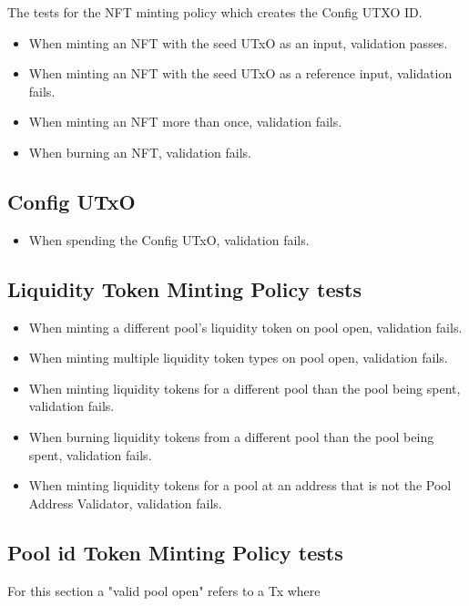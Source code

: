 \documentclass{article}
\begin{document}
The tests for the NFT minting policy which creates the Config UTXO ID.
\begin{itemize}
	\item When minting an NFT with the seed UTxO as an input, validation passes.
	\item When minting an NFT with the seed UTxO as a reference input, validation fails.
	\item When minting an NFT more than once, validation fails.
	\item When burning an NFT, validation fails.
\end{itemize}

\subsection*{Config UTxO}

\begin{itemize}
	\item When spending the Config UTxO, validation fails.
\end{itemize}

\subsection*{Liquidity Token Minting Policy tests}

\begin{itemize}
	\item When minting a different pool's liquidity token on pool open, validation fails.
	\item When minting multiple liquidity token types on pool open, validation fails.
	\item When minting liquidity tokens for a different pool than the pool being spent, validation fails.
	\item When burning liquidity tokens from a different pool than the pool being spent, validation fails.
	\item When minting liquidity tokens for a pool at an address that is not the Pool Address Validator, validation fails.
\end{itemize}

\subsection*{Pool id Token Minting Policy tests}

For this section a "valid pool open" refers to a Tx where
\end{document}
